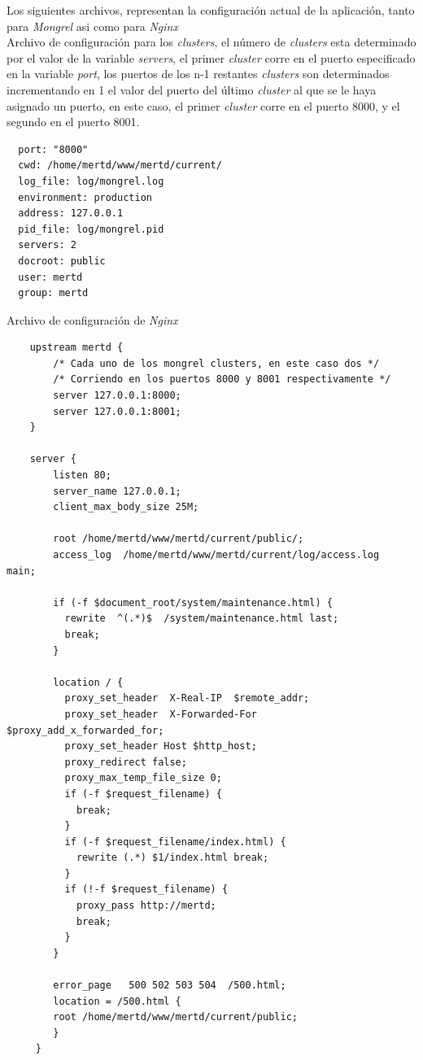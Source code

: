 Los siguientes archivos, representan la configuración actual de la aplicación, tanto para \emph{Mongrel} asi como para \emph{Nginx}\\

Archivo de configuración para los \emph{clusters}, el número de \emph{clusters} esta determinado por el valor de la variable \emph{servers}, el primer \emph{cluster} corre en el puerto especificado en la variable \emph{port}, los puertos de los n-1 restantes \emph{clusters} son determinados incrementando en 1 el valor del puerto del último \emph{cluster} al que se le haya asignado un puerto, en este caso, el primer \emph{cluster} corre en el puerto 8000, y el segundo en el puerto 8001.

\begin{verbatim}
  port: "8000" 
  cwd: /home/mertd/www/mertd/current/
  log_file: log/mongrel.log 
  environment: production 
  address: 127.0.0.1 
  pid_file: log/mongrel.pid 
  servers: 2
  docroot: public 
  user: mertd
  group: mertd 
\end{verbatim}

Archivo de configuración de \emph{Nginx}

\begin{verbatim}
	upstream mertd {
		/* Cada uno de los mongrel clusters, en este caso dos */
		/* Corriendo en los puertos 8000 y 8001 respectivamente */
		server 127.0.0.1:8000; 
		server 127.0.0.1:8001;
	}

	server {
	    listen 80;
	    server_name 127.0.0.1;
	    client_max_body_size 25M;

	    root /home/mertd/www/mertd/current/public/;
	    access_log  /home/mertd/www/mertd/current/log/access.log  main;

	    if (-f $document_root/system/maintenance.html) {
	      rewrite  ^(.*)$  /system/maintenance.html last;
	      break;
	    }

	    location / {
	      proxy_set_header  X-Real-IP  $remote_addr;
	      proxy_set_header  X-Forwarded-For $proxy_add_x_forwarded_for;
	      proxy_set_header Host $http_host;
	      proxy_redirect false;
	      proxy_max_temp_file_size 0;
	      if (-f $request_filename) {
	        break;
	      }
	      if (-f $request_filename/index.html) {
	        rewrite (.*) $1/index.html break;
	      }
	      if (!-f $request_filename) {
	        proxy_pass http://mertd;
	        break;
	      }
	    }

	    error_page   500 502 503 504  /500.html;
	    location = /500.html {
	    root /home/mertd/www/mertd/current/public;
	    }
	 }
\end{verbatim}

